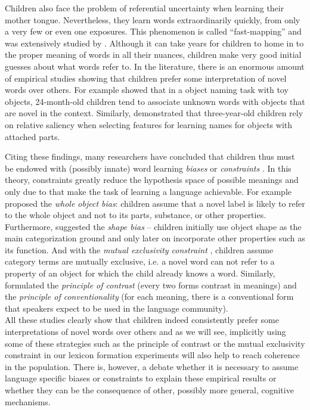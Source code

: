 Children also face the problem of referential uncertainty when
learning their mother tongue. Nevertheless, they learn words
extraordinarily quickly, from only a very few or even one
exposures. This phenomenon is called ``fast-mapping'' and was
extensively studied by \cite{carey78child}. Although it can take years
for children to home in to the proper meaning of words in all their
nuances, children make very good initial guesses about what words
refer to. In the literature, there is an enormous amount of empirical
studies showing that children prefer some interpretation of novel
words over others. For example \cite*{akhtar96role} showed that in a
object naming task with toy objects, 24-month-old children tend to
associate unknown words with objects that are novel in the
context. Similarly, \cite*{smith96naming} demonstrated that
three-year-old children rely on relative saliency when selecting
features for learning names for objects with attached parts.


Citing these findings, many researchers have concluded that children
thus must be endowed with (possibly innate) word learning
\emph{biases} or \emph{constraints} \citep{markman92constraints,
  gleitman90structural}. In this theory, constraints greatly reduce
the hypothesis space of possible meanings and only due to that make
the task of learning a language achievable. For example
\cite{macnamara82names} proposed the \emph{whole object bias}:
children assume that a novel label is likely to refer to the whole
object and not to its parts, substance, or other
properties. Furthermore, \cite*{landau98object} suggested the
\emph{shape bias} -- children initially use object shape as the main
categorization ground and only later on incorporate other properties
such as its function. And with the \emph{mutual exclusivity
  constraint} \citep{markman88childrens}, children assume category
terms are mutually exclusive, i.e. a novel word can not refer to a
property of an object for which the child already knows a
word. Similarly, \cite{clark87principle} formulated the
\emph{principle of contrast} (every two forms contrast in meanings)
and the \emph{principle of conventionality} (for each meaning, there
is a conventional form that speakers expect to be used in the language
community).\\


\noindent All these studies clearly show that children indeed consistently
prefer some interpretations of novel words over others and as we will
see, implicitly using some of these strategies such as the principle
of contrast or the mutual exclusivity constraint in our lexicon
formation experiments will also help to reach coherence in the
population. There is, however, a debate whether it is necessary to
assume language specific biases or constraints to explain these
empirical results or whether they can be the consequence of other,
possibly more general, cognitive mechanisms.



